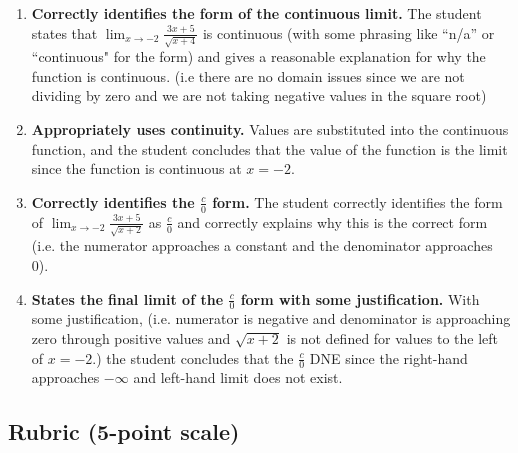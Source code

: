 \documentclass[11pt]{article}
\begin{document}
\begin{enumerate}
    \item \textbf{Correctly identifies the form of the continuous limit.}  
    The student states that \(\displaystyle \lim_{x\to -2}\frac{3x+5}{\sqrt{x+4}}\) is continuous (with some phrasing like “n/a” or ``continuous" for the form) and gives a reasonable explanation for why the function is continuous. (i.e there are no domain issues since we are not dividing by zero and we are not taking negative values in the square root)\\
    \item \textbf{Appropriately uses continuity.}  
    Values are substituted into the continuous function, and the student concludes that the value of the function is the limit since the function is continuous at $x = -2$.\\
    \item \textbf{Correctly identifies the $\frac{c}{0}$ form.}
    The student correctly identifies the form of \(\displaystyle \lim_{x\to -2}\frac{3x+5}{\sqrt{x+2}}\) as $\frac{c}{0}$ and correctly explains why this is the correct form (i.e. the numerator approaches a constant and the denominator approaches 0).\\
    \item \textbf{States the final limit of the $\frac{c}{0}$ form with some justification.}  
    With some justification, (i.e. numerator is negative and denominator is approaching zero through positive values and $\sqrt{x+2}$ is not defined for values to the left of $x = -2$.) the student concludes that the $\frac{c}{0}$ DNE since the right-hand approaches $-\infty$ and left-hand limit does not exist.
\end{enumerate}

\subsection*{Rubric (5-point scale)}
\end{document}
